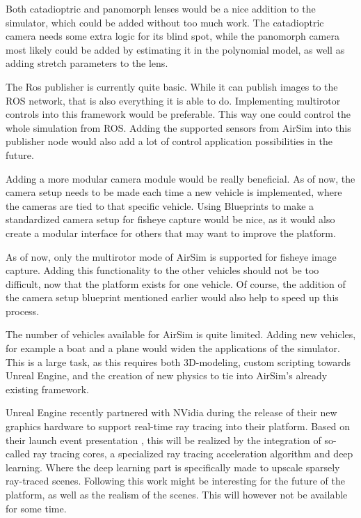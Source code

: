 Both catadioptric and panomorph lenses would be a nice addition to the simulator, which could be added without too much work. The catadioptric camera needs some extra logic for its blind spot, while the panomorph camera most likely could be added by estimating it in the polynomial model, as well as adding stretch parameters to the lens.

The Ros publisher is currently quite basic. While it can publish images to the ROS network, that is also everything it is able to do. Implementing multirotor controls into this framework would be preferable. This way one could control the whole simulation from ROS. Adding the supported sensors from AirSim into this publisher node would also add a lot of control application possibilities in the future.

Adding a more modular camera module would be really beneficial. As of now, the camera setup needs to be made each time a new vehicle is implemented, where the cameras are tied to that specific vehicle. Using Blueprints to make a standardized camera setup for fisheye capture would be nice, as it would also create a modular interface for others that may want to improve the platform.

As of now, only the multirotor mode of AirSim is supported for fisheye image capture. Adding this functionality to the other vehicles should not be too difficult, now that the platform exists for one vehicle. Of course, the addition of the camera setup blueprint mentioned earlier would also help to speed up this process.

The number of vehicles available for AirSim is quite limited. Adding new vehicles, for example a boat and a plane would widen the applications of the simulator. This is a large task, as this requires both 3D-modeling, custom scripting towards Unreal Engine, and the creation of new physics to tie into AirSim's already existing framework.

Unreal Engine recently partnered with NVidia during the release of their new graphics hardware to support real-time ray tracing into their platform. Based on their launch event presentation \cite{NvidiaConference}, this will be realized by the integration of so-called ray tracing cores, a specialized ray tracing acceleration algorithm and deep learning. Where the deep learning part is specifically made to upscale sparsely ray-traced scenes. Following this work might be interesting for the future of the platform, as well as the realism of the scenes. This will however not be available for some time.



